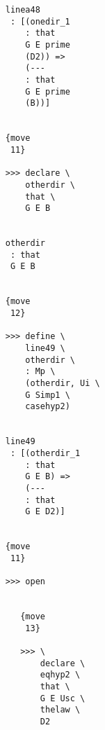 \documentclass[12pt]{article}
\begin{document}
\begin{verbatim}
                                    linea48 
                                     : [(onedir_1 
                                        : that 
                                        G E prime 
                                        (D2)) => 
                                        (--- 
                                        : that 
                                        G E prime 
                                        (B))]


                                    {move 
                                     11}

                                    >>> declare \
                                        otherdir \
                                        that \
                                        G E B


                                    otherdir 
                                     : that 
                                     G E B


                                    {move 
                                     12}

                                    >>> define \
                                        line49 \
                                        otherdir \
                                        : Mp \
                                        (otherdir, Ui \
                                        G Simp1 \
                                        casehyp2)


                                    line49 
                                     : [(otherdir_1 
                                        : that 
                                        G E B) => 
                                        (--- 
                                        : that 
                                        G E D2)]


                                    {move 
                                     11}

                                    >>> open


                                       {move 
                                        13}

                                       >>> \
                                           declare \
                                           eqhyp2 \
                                           that \
                                           G E Usc \
                                           thelaw \
                                           D2



\end{verbatim}
\end{document}
